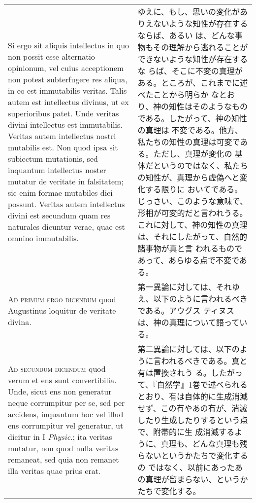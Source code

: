 \documentclass[10pt]{jsarticle} %
\begin{document}
\begin{longtable}{p{21em}p{21em}}
\\

Si ergo sit aliquis intellectus in quo non possit esse alternatio
opinionum, vel cuius acceptionem non potest subterfugere res aliqua,
in eo est immutabilis veritas. Talis autem est intellectus divinus, ut
ex superioribus patet. Unde veritas divini intellectus est
immutabilis. Veritas autem intellectus nostri mutabilis est. Non quod
ipsa sit subiectum mutationis, sed inquantum intellectus noster
mutatur de veritate in falsitatem; sic enim formae mutabiles dici
possunt. Veritas autem intellectus divini est secundum quam res
naturales dicuntur verae, quae est omnino immutabilis.

&

ゆえに、もし、思いの変化がありえないような知性が存在するならば、あるい
は、どんな事物もその理解から逃れることができないような知性が存在するな
らば、そこに不変の真理がある。ところが、これまでに述べたことから明らか
なとおり、神の知性はそのようなものである。したがって、神の知性の真理は
不変である。他方、私たちの知性の真理は可変である。ただし、真理が変化の
基体だというのではなく、私たちの知性が、真理から虚偽へと変化する限りに
おいてである。じっさい、このような意味で、形相が可変的だと言われうる。
これに対して、神の知性の真理は、それにしたがって、自然的諸事物が真と言
われるものであって、あらゆる点で不変である。

\\

{\scshape Ad primum ergo dicendum} quod
Augustinus loquitur de veritate divina.

&

第一異論に対しては、それゆえ、以下のように言われるべきである。アウグス
ティヌスは、神の真理について語っている。

\\


{\scshape Ad secundum dicendum} quod verum et ens sunt
convertibilia. Unde, sicut ens non generatur neque corrumpitur per se,
sed per accidens, inquantum hoc vel illud ens corrumpitur vel
generatur, ut dicitur in I {\itshape Physic}.; ita veritas mutatur,
non quod nulla veritas remaneat, sed quia non remanet illa veritas
quae prius erat.

& 

第二異論に対しては、以下のように言われるべきである。真と有は置換されう
る。したがって、『自然学』1巻で述べられるとおり、有は自体的に生成消滅
せず、この有やあの有が、消滅したり生成したりするという点で、附帯的に生
成消滅するように、真理も、どんな真理も残らないというかたちで変化するの
ではなく、以前にあったあの真理が留まらない、というかたちで変化する。



\end{longtable}
\end{document}
